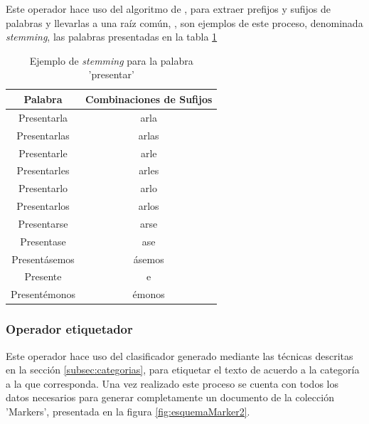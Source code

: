 Este operador hace uso del algoritmo de \cite{Porter}, para extraer prefijos y sufijos de palabras y llevarlas a una raíz común, \cite{StemmingLema}, son ejemplos de este proceso, denominada \textit{stemming}, las palabras presentadas en la tabla \ref{tab:ejstemming}

\begin{table}[H]
\centering
\caption{Ejemplo de \textit{stemming} para la palabra 'presentar'}
\label{tab:ejstemming}
\begin{tabular}{|c|c|}
\hline
\textbf{Palabra} & \textbf{Combinaciones de Sufijos} \\ \hline
Presentarla      & arla                              \\ \hline
Presentarlas     & arlas                             \\ \hline
Presentarle      & arle                              \\ \hline
Presentarles     & arles                             \\ \hline
Presentarlo      & arlo                              \\ \hline
Presentarlos     & arlos                             \\ \hline
Presentarse      & arse                              \\ \hline
Presentase       & ase                               \\ \hline
Presentásemos    & ásemos                            \\ \hline
Presente         & e                                 \\ \hline
Presentémonos    & émonos                            \\ \hline
\end{tabular}
\end{table}

\subsubsection{Operador etiquetador}
\label{subsubsec:7op}

Este operador hace uso del clasificador generado mediante las técnicas descritas en la sección \ref{subsec:categorias}, para etiquetar el texto de acuerdo a la categoría a la que corresponda. Una vez realizado este proceso se cuenta con todos los datos necesarios para generar completamente un documento de la colección 'Markers', presentada en la figura \ref{fig:esquemaMarker2}.

